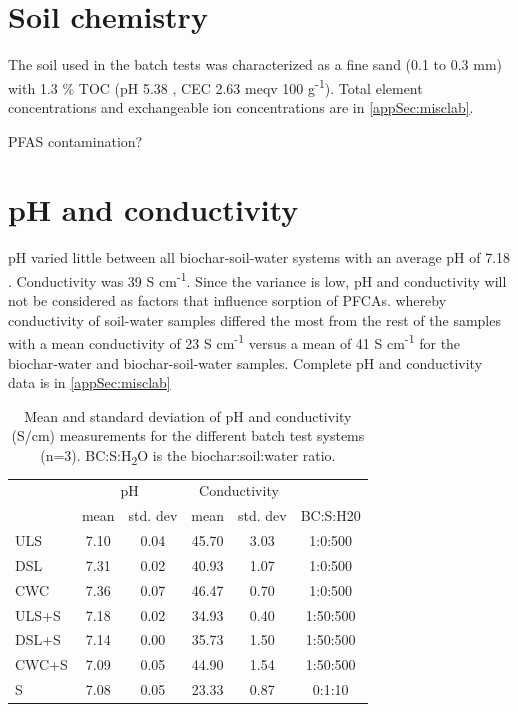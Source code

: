 \section{Soil chemistry}
The soil used in the batch tests was characterized as a fine sand (0.1 to 0.3 mm) with 1.3 \% TOC (pH 5.38  , CEC 2.63  meqv 100 g\textsuperscript{-1}). Total element concentrations and exchangeable ion concentrations are in \ref{appSec:misclab}. 

PFAS contamination?



\section{pH and conductivity}
pH varied little between all biochar-soil-water systems with an average pH of 7.18 . Conductivity was 39  \textmu S cm\textsuperscript{-1}. Since the variance is low, pH and conductivity will not be considered as factors that influence sorption of PFCAs. whereby conductivity of soil-water samples differed the most from the rest of the samples with a mean conductivity of 23  \textmu S cm\textsuperscript{-1} versus a mean of 41  \textmu S cm\textsuperscript{-1} for the biochar-water and biochar-soil-water samples. Complete pH and conductivity data is in \cref{appSec:misclab} 

\begin{table}
\centering
\caption{Mean and standard deviation of pH and conductivity (\textmu S/cm) measurements for the different batch test systems (n=3). BC:S:H\textsubscript{2}O is the biochar:soil:water ratio.}
\label{tab:pHcond}
\begin{tabular}{lccccc}
\toprule
 & \multicolumn{2}{c}{pH} & \multicolumn{2}{c}{Conductivity} & \\
 & mean & std. dev & mean & std. dev & BC:S:H20\\
\midrule
ULS & 7.10 & 0.04 & 45.70 & 3.03 & 1:0:500\\
DSL & 7.31 & 0.02 & 40.93 & 1.07 & 1:0:500\\
CWC & 7.36 & 0.07 & 46.47 & 0.70 & 1:0:500\\
ULS+S & 7.18 & 0.02 & 34.93 & 0.40 & 1:50:500\\
DSL+S & 7.14 & 0.00 & 35.73 & 1.50 & 1:50:500\\
CWC+S & 7.09 & 0.05 & 44.90 & 1.54 & 1:50:500\\
S & 7.08 & 0.05 & 23.33 & 0.87 & 0:1:10\\
\bottomrule
\end{tabular}
\end{table}

